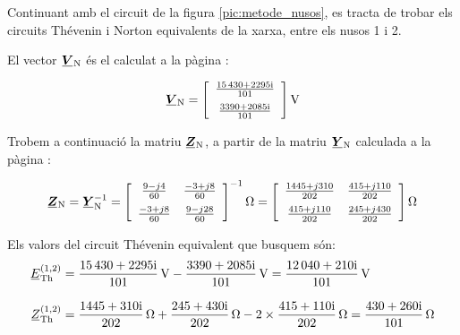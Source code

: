 \begin{exemple}\label{ex:XarxaThevenin}
	\addcontentsxms{\XarxaThevenin}
    Continuant amb el circuit de la figura \vref{pic:metode_nusos}, es
    tracta de trobar els circuits Thévenin i Norton equivalents de la
    xarxa, entre els nusos 1 i 2.

    El vector $\mcmplx{V}\ped{N}$ és el calculat a la pàgina \pageref{eq:vn_exemp}:

    \[
      \mcmplx{V}\ped{N} =
      \begin{bmatrix}\begin{array}{c} 
            \frac{\complexnum{15430 + j 2295}}{101} \\[2mm]
            \frac{\complexnum{3390 + j 2085}}{101}
      \end{array}\end{bmatrix}\unit{V}
   \]

    Trobem a continuació la matriu $\mcmplx{Z}\ped{N}$, a partir de la matriu $\mcmplx{Y}\ped{N}$
    calculada a la pàgina \pageref{eq:yn}:

    \[
       \mcmplx{Z}\ped{N} =  \mcmplx{Y}\ped{N}^{-1} =
       \begin{bmatrix}\begin{array}{cc} 
                \frac{9 - j 4}{60} & \frac{-3 + j 8}{60} \\[2mm]
                \frac{-3 + j 8}{60} & \frac{9 - j 28}{60}
       \end{array}\end{bmatrix}^{-1}\unit{\ohm} =
       \begin{bmatrix}\begin{array}{cc} 
             \frac{1445 + j 310}{202} & \frac{415 + j 110}{202} \\[2mm]
             \frac{415 + j 110}{202} & \frac{245 + j 430}{202}
       \end{array}\end{bmatrix}\unit{\ohm}
    \]

    Els valors del circuit Thévenin equivalent que busquem són:
    \begin{align*}
       \cmplx{E}\ped{Th}^{(1,2)} &= \frac{\complexnum{15430+j2295}}{101}\,\unit{V} - \frac{\complexnum{3390+j2085}}{101}\,\unit{V} =
       \frac{\complexnum{12040+j210}}{101}\,\unit{V} \\[2ex]
       \cmplx{Z}\ped{Th}^{(1,2)} &= \frac{\complexnum{1445+j310}}{202}\,\unit{\ohm} + \frac{\complexnum{245+j430}}{202}\,\unit{\ohm} -
       2\times\frac{\complexnum{415+j110}}{202}\,\unit{\ohm} = \frac{\complexnum{430+j260}}{101}\,\unit{\ohm}
    \end{align*}


\end{exemple}
